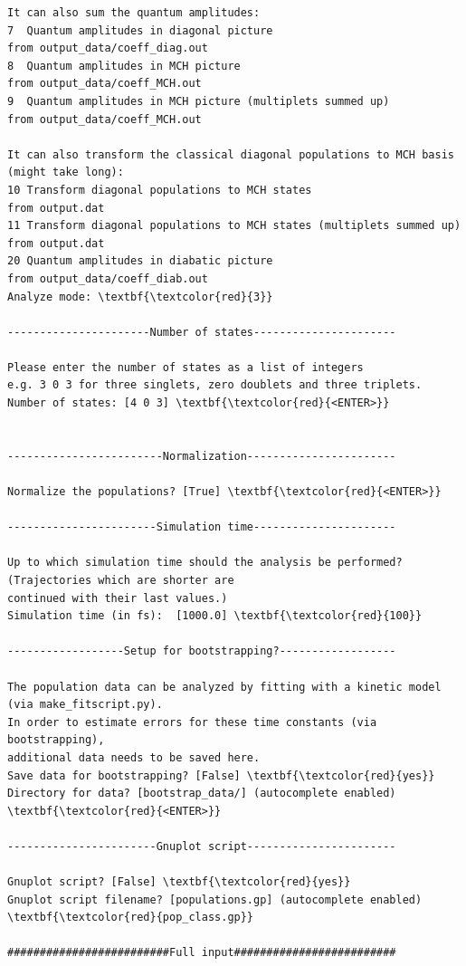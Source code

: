 \documentclass[a4paper,11pt,DIV=15,openany]{scrbook}
\begin{document}
\begin{oframed}
\begin{Verbatim}[commandchars=\\\{\}]
It can also sum the quantum amplitudes:
7  Quantum amplitudes in diagonal picture                                    from output_data/coeff_diag.out
8  Quantum amplitudes in MCH picture                                         from output_data/coeff_MCH.out
9  Quantum amplitudes in MCH picture (multiplets summed up)                  from output_data/coeff_MCH.out

It can also transform the classical diagonal populations to MCH basis (might take long):
10 Transform diagonal populations to MCH states                              from output.dat
11 Transform diagonal populations to MCH states (multiplets summed up)       from output.dat
20 Quantum amplitudes in diabatic picture                                    from output_data/coeff_diab.out
Analyze mode: \textbf{\textcolor{red}{3}}

----------------------Number of states----------------------

Please enter the number of states as a list of integers
e.g. 3 0 3 for three singlets, zero doublets and three triplets.
Number of states: [4 0 3] \textbf{\textcolor{red}{<ENTER>}}


------------------------Normalization-----------------------

Normalize the populations? [True] \textbf{\textcolor{red}{<ENTER>}}

-----------------------Simulation time----------------------

Up to which simulation time should the analysis be performed? (Trajectories which are shorter are 
continued with their last values.)
Simulation time (in fs):  [1000.0] \textbf{\textcolor{red}{100}}

------------------Setup for bootstrapping?------------------

The population data can be analyzed by fitting with a kinetic model (via make_fitscript.py). 
In order to estimate errors for these time constants (via bootstrapping), 
additional data needs to be saved here.
Save data for bootstrapping? [False] \textbf{\textcolor{red}{yes}}
Directory for data? [bootstrap_data/] (autocomplete enabled) \textbf{\textcolor{red}{<ENTER>}}

-----------------------Gnuplot script-----------------------

Gnuplot script? [False] \textbf{\textcolor{red}{yes}}
Gnuplot script filename? [populations.gp] (autocomplete enabled) \textbf{\textcolor{red}{pop_class.gp}}

#########################Full input#########################


\end{Verbatim}
\end{oframed}
\end{document}
